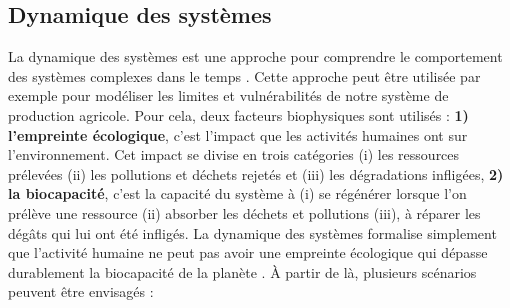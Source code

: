 \documentclass[../thesis.tex]{subfiles}
\begin{document}
    
    \newpage
    \subsection{Dynamique des systèmes}
    
    La dynamique des systèmes est une approche pour comprendre le comportement des systèmes complexes dans le temps \cite{ArthurKeller}. Cette approche peut être utilisée par exemple pour modéliser les limites et vulnérabilités de notre système de production agricole. Pour cela, deux facteurs biophysiques sont utilisés :
    \textbf{1) l'empreinte écologique}, c'est l'impact que les activités humaines ont sur l'environnement. Cet impact se divise en trois catégories (i) les ressources prélevées (ii) les pollutions et déchets rejetés et (iii) les dégradations infligées,
    \textbf{2) la biocapacité}, c'est la capacité du système à (i) se régénérer lorsque l'on prélève une ressource (ii) absorber les déchets et pollutions (iii), à réparer les dégâts qui lui ont été infligés.
    La dynamique des systèmes formalise simplement que l'activité humaine \og ne peut pas avoir une empreinte écologique qui dépasse durablement la biocapacité de la planète \fg. %
    À partir de là, plusieurs scénarios peuvent être envisagés \cite{martino1973limits, ArthurKeller, herrington2021update}: %
    
\end{document}
